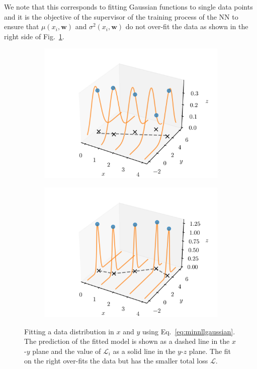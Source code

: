 \documentclass{article}
\begin{document}
We note that this corresponds to fitting Gaussian functions to single data points and it is the objective of the supervisor of the training process of the NN to ensure that $\mu(x_i, \bm{w})$ and $\sigma^2(x_i, \bm{w})$ do not over-fit the data as shown in the right side of Fig.~\ref{fig:greg}.
\begin{figure}[htbp]
    \centering
    \begin{subfigure}{.45\textwidth}
        \centering
        \includegraphics[width=\textwidth]{greg.png}
    \end{subfigure}
    \begin{subfigure}{.45\textwidth}
        \centering
        \includegraphics[width=\textwidth]{greg2.png}
    \end{subfigure}
    \caption{Fitting a data distribution in $x$ and $y$ using Eq.~\eqref{eq:minnllgaussian}. The prediction of the fitted model is shown as a dashed line in the $x$-$y$ plane and the value of $\mathcal{L}_i$ as a solid line in the $y$-$z$ plane. The fit on the right over-fits the data but has the smaller total loss $\mathcal{L}$.}
    \label{fig:greg}
\end{figure}
\end{document}
